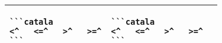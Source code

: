 \documentclass[a3paper,landscape]{article}
\begin{document}
\begin{multicols*}{2}
\begin{center}
\begin{tabular}{p{}p{}p{}}
      \begin{verbatim}
```catala
<^   <=^   >^   >=^
```
\end{verbatim}
      \vspace*{-1.75em}
                                      &
      \vspace*{-1.75em}
      \begin{verbatim}
```catala
<^   <=^   >^   >=^
```
\end{verbatim}
      \vspace*{-1.75em}
      \\
      \bottomrule
    \end{tabular}
  \end{center}



\end{multicols*}
\end{document}
